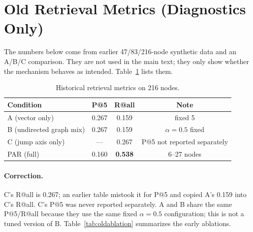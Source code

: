 \documentclass[11pt]{article}
\begin{document}
\fi
\appendix

\section{Old Retrieval Metrics (Diagnostics Only)}
\label{app:oldmetrics}

The numbers below come from earlier 47/83/216-node synthetic data and an A/B/C comparison. They
are not used in the main text; they only show whether the mechanism behaves as intended.
Table~\ref{tab:oldmetrics} lists them.

\begin{table}[ht]
  \centering
  \small
  \begin{tabular}{@{}lccc@{}}
    \toprule
    Condition & P@5 & R@all & Note \\
    \midrule
    A (vector only) & 0.267 & 0.159 & fixed 5 \\
    B (undirected graph mix) & 0.267 & 0.159 & $\alpha=0.5$ fixed \\
    C (jump axis only) & --- & 0.267 & P@5 not reported separately \\
    PAR (full) & 0.160 & \textbf{0.538} & 6--27 nodes \\
    \bottomrule
  \end{tabular}
  \caption{Historical retrieval metrics on 216 nodes.}\label{tab:oldmetrics}
\end{table}

\paragraph{Correction.}
C's R@all is 0.267; an earlier table mistook it for P@5 and copied A's 0.159 into C's R@all.
C's P@5 was never reported separately. A and B share the same P@5/R@all because they use the same
fixed $\alpha=0.5$ configuration; this is not a tuned version of B.
Table~\ref{tab:oldablation} summarizes the early ablations.
\end{document}
